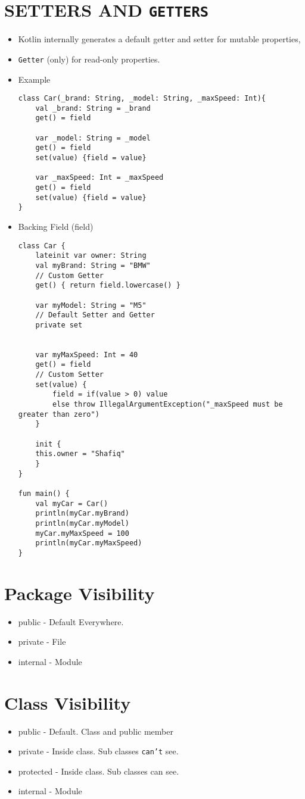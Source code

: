 \documentclass[11pt]{article}
\begin{document}
\section*{SETTERS AND \texttt{GETTERS}}
\label{sec:orgcc8fcd8}
\begin{itemize}
\item Kotlin internally generates a default getter and setter for
mutable properties,
\item \texttt{Getter} (only) for read-only properties.
\item Example
\begin{verbatim}
class Car(_brand: String, _model: String, _maxSpeed: Int){
    val _brand: String = _brand
	get() = field

    var _model: String = _model
	get() = field
	set(value) {field = value}

    var _maxSpeed: Int = _maxSpeed
	get() = field
	set(value) {field = value}
}
\end{verbatim}
\item Backing Field (field)
\begin{verbatim}
class Car {
    lateinit var owner: String
    val myBrand: String = "BMW"
    // Custom Getter
	get() { return field.lowercase() }

    var myModel: String = "M5"
    // Default Setter and Getter
	private set


    var myMaxSpeed: Int = 40
	get() = field
    // Custom Setter
	set(value) {
	    field = if(value > 0) value
	    else throw IllegalArgumentException("_maxSpeed must be greater than zero")
	}

    init {
	this.owner = "Shafiq"
    }
}

fun main() {
    val myCar = Car()
    println(myCar.myBrand)
    println(myCar.myModel)
    myCar.myMaxSpeed = 100
    println(myCar.myMaxSpeed)
}
\end{verbatim}
\end{itemize}
\section*{Package Visibility}
\label{sec:org7667f9c}
\begin{itemize}
\item public - Default Everywhere.
\item private - File
\item internal - Module
\end{itemize}
\section*{Class Visibility}
\label{sec:orgab8b934}
\begin{itemize}
\item public - Default. Class and public member
\item private - Inside class. Sub classes \texttt{can't} see.
\item protected - Inside class. Sub classes can see.
\item internal - Module
\end{itemize}
\end{document}
